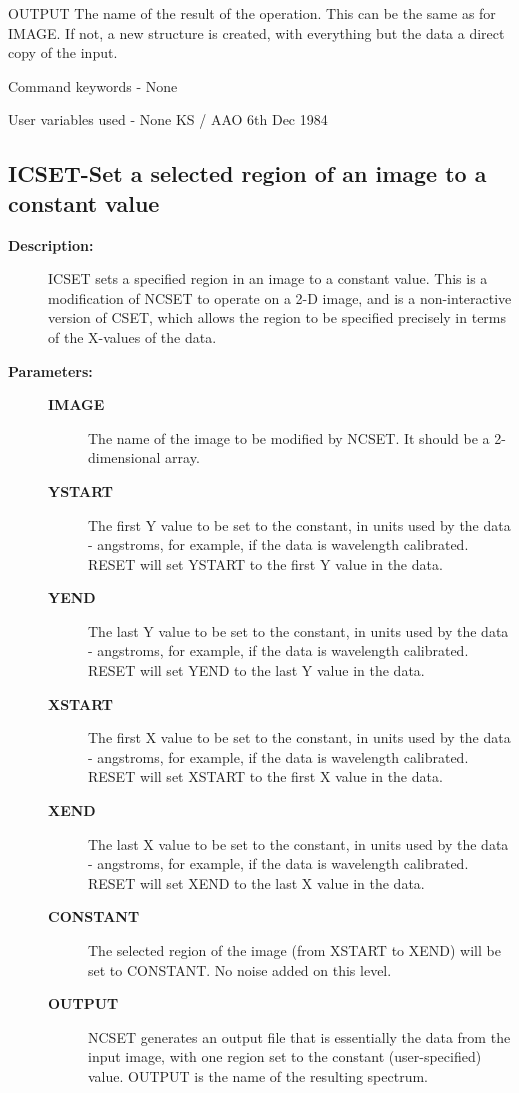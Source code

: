 \begin{description}
\begin{description}
\begin{terminalv}
 OUTPUT The name of the result of the operation.  This can
        be the same as for IMAGE.  If not, a new structure
        is created, with everything but the data a direct
        copy of the input.

 Command keywords  - None

 User variables used - None
                                  KS / AAO 6th Dec 1984
\end{terminalv}
\end{description}
\subsection{ICSET-\label{ICSET}Set a selected region of an image to a constant value}
\begin{description}

\item [\textbf{Description:}]
 ICSET sets a specified region in an image to a constant value.
 This is a modification of NCSET to operate on a 2-D image, and is
 a non-interactive version of CSET, which allows the region
 to be specified precisely in terms of the X-values of the data.

\item [\textbf{Parameters:}]
\begin{description}
\item [\textbf{IMAGE}]
 The name of the image to be modified by NCSET.
 It should be a 2-dimensional array.
\item [\textbf{YSTART}]
 The first Y value to be set to the constant,
 in units used by the data - angstroms, for example, if the
 data is wavelength calibrated.  RESET will set YSTART to the
 first Y value in the data.
\item [\textbf{YEND}]
 The last Y value to be set to the constant,
 in units used by the data - angstroms, for example, if the
 data is wavelength calibrated.  RESET will set YEND to the
 last Y value in the data.
\item [\textbf{XSTART}]
 The first X value to be set to the constant,
 in units used by the data - angstroms, for example, if the
 data is wavelength calibrated.  RESET will set XSTART to the
 first X value in the data.
\item [\textbf{XEND}]
 The last X value to be set to the constant,
 in units used by the data - angstroms, for example, if the
 data is wavelength calibrated.  RESET will set XEND to the
 last X value in the data.
\item [\textbf{CONSTANT}]
 The selected region of the image (from XSTART to
 XEND) will be set to CONSTANT. No noise added on this
 level.
\item [\textbf{OUTPUT}]
 NCSET generates an output file that is essentially the
 data from the input image, with one region set to the
 constant (user-specified) value.  OUTPUT is the name of
 the resulting spectrum.
\end{description}


\end{description}
\end{description}
